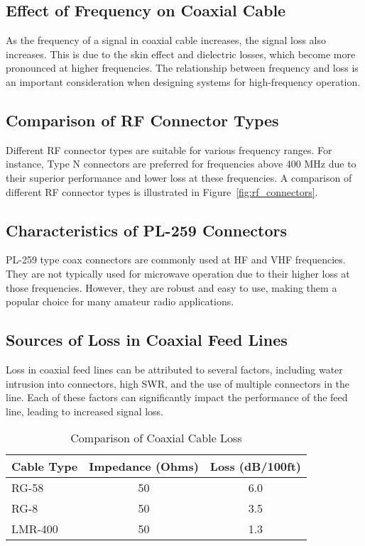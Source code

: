 \subsection*{Effect of Frequency on Coaxial Cable}
As the frequency of a signal in coaxial cable increases, the signal loss also increases. This is due to the skin effect and dielectric losses, which become more pronounced at higher frequencies. The relationship between frequency and loss is an important consideration when designing systems for high-frequency operation.

\subsection*{Comparison of RF Connector Types}
Different RF connector types are suitable for various frequency ranges. For instance, Type N connectors are preferred for frequencies above 400 MHz due to their superior performance and lower loss at these frequencies. A comparison of different RF connector types is illustrated in Figure~\ref{fig:rf_connectors}.

\subsection*{Characteristics of PL-259 Connectors}
PL-259 type coax connectors are commonly used at HF and VHF frequencies. They are not typically used for microwave operation due to their higher loss at those frequencies. However, they are robust and easy to use, making them a popular choice for many amateur radio applications.

\subsection*{Sources of Loss in Coaxial Feed Lines}
Loss in coaxial feed lines can be attributed to several factors, including water intrusion into connectors, high SWR, and the use of multiple connectors in the line. Each of these factors can significantly impact the performance of the feed line, leading to increased signal loss.

\begin{table}[h]
    \centering
    \caption{Comparison of Coaxial Cable Loss}
    \label{tab:coax_loss}
    \begin{tabular}{|l|c|c|}
        \hline
        \textbf{Cable Type} & \textbf{Impedance (Ohms)} & \textbf{Loss (dB/100ft)} \\
        \hline
        RG-58 & 50 & 6.0 \\
        RG-8 & 50 & 3.5 \\
        LMR-400 & 50 & 1.3 \\
        \hline
    \end{tabular}
\end{table}

